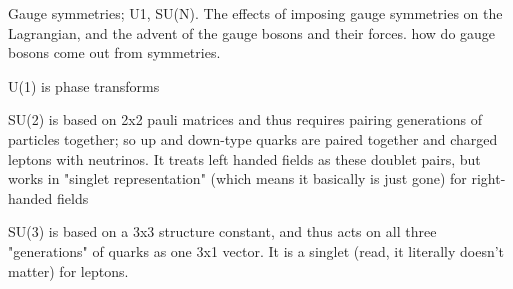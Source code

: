     Gauge symmetries; U1, SU(N).
    The effects of imposing gauge symmetries on the Lagrangian, and the advent of the gauge bosons and their forces.
    how do gauge bosons come out from symmetries.

    U(1) is phase transforms

    SU(2) is based on 2x2 pauli matrices and thus requires pairing generations of particles together;
        so up and down-type quarks are paired together and charged leptons with neutrinos.
    It treats left handed fields as these doublet pairs,
        but works in "singlet representation" (which means it basically is just gone) for right-handed fields

    SU(3) is based on a 3x3 structure constant, and thus acts on all three "generations" of quarks as one 3x1 vector.
    It is a singlet (read, it literally doesn't matter) for leptons.
    
    \cite{Osborn_notes}
    \cite{Peskin_book}
    \cite{Halzen_book}

